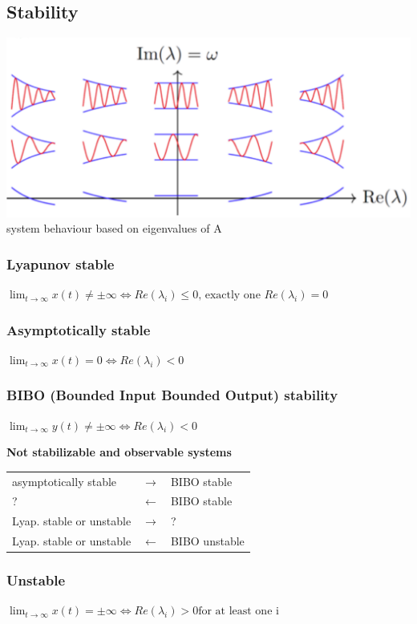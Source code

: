 \subsection{Stability}
    \includegraphics[width = \linewidth]{src/images/eigenvalue_response.png}
    system behaviour based on eigenvalues of A

    \subsubsection{Lyapunov stable}
    $\lim_{t \rightarrow \infty} x(t) \neq \pm \infty \Leftrightarrow Re(\lambda_i) \leq 0 \text{, exactly one } Re(\lambda_i) = 0$

    \subsubsection{Asymptotically stable}
    $\lim_{t \rightarrow \infty} x(t) = 0 \Leftrightarrow Re(\lambda_i) < 0$

    \subsubsection{BIBO (Bounded Input Bounded Output) stability}
    $\lim_{t \rightarrow \infty} y(t) \neq \pm \infty \Leftrightarrow Re(\lambda_i) < 0$

    \begin{center}
        \textbf{Not stabilizable and observable systems}
    \end{center}
    \begin{tabu}{|X[6] X X[3]|}
        \hline
        asymptotically stable & $\rightarrow$ & BIBO stable\\
        ? & $\leftarrow$ & BIBO stable\\
        Lyap. stable or unstable & $\rightarrow$ & ?\\
        Lyap. stable or unstable & $\leftarrow$ & BIBO unstable\\
        \hline
    \end{tabu}

    \subsubsection{Unstable}
    $\lim_{t \rightarrow \infty} x(t) = \pm \infty \Leftrightarrow Re(\lambda_i) > 0 \text{for at least one i}$